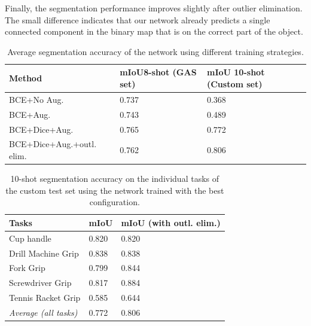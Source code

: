 \documentclass[letterpaper]{article} %
\begin{document}
Finally, the segmentation performance improves slightly after outlier elimination. The small difference indicates that our network already predicts a single connected component in the binary map that is on the correct part of the object.


\begin{table}[h!]
\centering
\caption{Average segmentation accuracy of the network using different training strategies.}
\begin{tabular}{|p{3.5cm}|p{1.6cm}|p{2.0cm}|}
 \hline
 \textbf{Method}& \textbf{mIoU}\newline \textbf{8-shot} \newline \textbf{(GAS set)} & \textbf{mIoU} \newline \textbf{10-shot} \newline \textbf{(Custom set)}  \\
 \hline
 BCE+No Aug.& 0.737 & 0.368  \\
 \hline
 BCE+Aug.& 0.743 & 0.489  \\
 \hline
 BCE+Dice+Aug. & 0.765 & 0.772  \\
 \hline
 BCE+Dice+Aug.+outl. elim. & 0.762& 0.806 \\
 \hline
\end{tabular}
\label{table:networks}
\end{table}

\begin{table}[h!]
\centering
\caption{10-shot segmentation accuracy on the individual tasks of the custom test set using the network trained with the best configuration.}
\begin{tabular}{|p{3.2cm}|p{1.2cm}|p{2.6cm}|}
 \hline
 \textbf{Tasks} & \textbf{mIoU}  & \textbf{mIoU} \newline \textbf{(with outl. elim.)} \\
 \hline
 Cup handle & 0.820 & 0.820 \\
 \hline
 Drill Machine Grip & 0.838 & 0.838 \\
 \hline
 Fork Grip & 0.799 & 0.844 \\
 \hline
 Screwdriver Grip  & 0.817 & 0.884\\
 \hline
 Tennis Racket Grip & 0.585 & 0.644 \\
 \hline
 \textit{Average (all tasks)} & 0.772 & 0.806\\
 \hline
\end{tabular}
\label{table:tasks}
\end{table}
\end{document}
